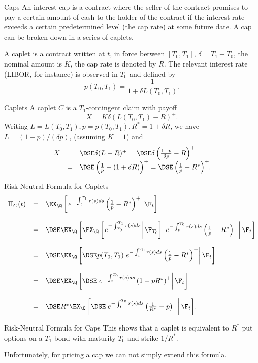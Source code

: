 Caps
	An interest cap is a contract where the seller of the
	contract promises to pay a certain amount of cash to the holder of
	the contract if the interest rate exceeds a certain predetermined
	level (the cap rate) at some future date. A cap can be broken down
	in a series of caplets.

	A caplet is a contract written at $t$,
	in force between $[T_0, T_1],\, \delta = T_1-T_0$,
	the nominal amount is $K$, the cap rate is denoted
	by $R$. The relevant interest rate (LIBOR, for instance) is
	observed in $T_0$ and defined by
		$$
		p(T_0,T_1) = \frac{1}{1 + \delta L(T_0,T_1)}.
		$$


Caplets
	A caplet $C$ is a $T_1$-contingent claim with payoff
		$$
		X = K \delta
		(L(T_0,T_1)-R)^+.
		$$
	Writing $L = L(T_0,T_1), p=p(T_0,T_1), R^*=1 + \delta R$, we have $L=(1-p)/(\delta p)$, (assuming $K=1$) and
		$$
		\begin{array}{lll}
		X &=&\DSE \delta (L-R)^+ =\DSE \delta \left(\frac{1-p}{\delta p}
		-R\right)^+\\
		&=&\DSE \left(\frac{1}{p} - (1+ \delta R) \right)^+ = \DSE
		\left(\frac{1}{p} - R^* \right)^+\!\!.
		\end{array}
		$$


Risk-Neutral Formula for Caplets
{\tiny
	$$
	\begin{array}{lll}
	\Pi_C(t) &=& \EX_{\Q}\left[ \left. e^{- \int_t^{T_1} r(s)ds}
	\left(\frac{1}{p} - R^* \right)^+\right|\F_t\right]
	\\*[18pt]
	&=&\DSE \EX_{\Q}\left[ \EX_{\Q}\left[\left.e^{- \int_{T_{0}}^{T_1}
	r(s)ds}\right|\F_{T_{0}}\right]\right. \left. \left.e^{-
	\int_t^{T_0} r(s)ds} \left(\frac{1}{p} - R^*
	\right)^+\right|\F_t\right]\\*[18pt] &=&\DSE \EX_{\Q}\left[ \DSE
	p(T_{0},T_1) \left.e^{- \int_t^{T_0} r(s)ds} \left(\frac{1}{p} -
	R^* \right)^+\right|\F_t\right]\\*[18pt] &=&\DSE \EX_{\Q}\left[
	\DSE \left.e^{- \int_t^{T_0} r(s)ds} \left(1 - p R^*
	\right)^+\right|\F_t\right]\\*[18pt] &=&\DSE R^*\EX_{\Q}\left[
	\DSE \left.e^{- \int_t^{T_0} r(s)ds} \left(\frac{1}{R^*} - p
	\right)^+\right|\F_t\right]\!.
	\end{array}
	$$}


Risk-Neutral Formula for Caps
	This shows that a caplet is equivalent to $R^*$ put options on a $T_1$-bond
	with maturity $T_0$ and strike $1/R^*$.
	
	Unfortunately, for pricing a cap we can not simply extend this formula.


